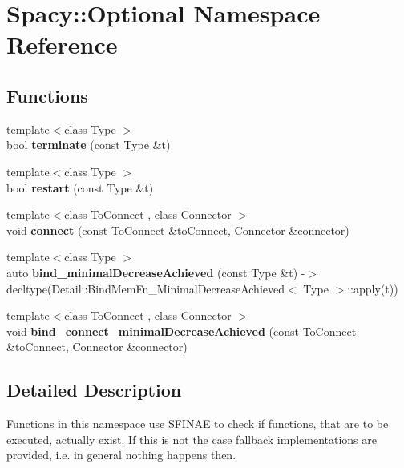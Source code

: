 \hypertarget{namespaceSpacy_1_1Optional}{\section{Spacy\-:\-:Optional Namespace Reference}
\label{namespaceSpacy_1_1Optional}
}
\subsection*{Functions}
\begin{DoxyCompactItemize}
\item 
\hypertarget{namespaceSpacy_1_1Optional_afc94d50f5d9d1b2b53b374d58fc0089f}{{\footnotesize template$<$class Type $>$ }\\bool {\bfseries terminate} (const Type \&t)}\label{namespaceSpacy_1_1Optional_afc94d50f5d9d1b2b53b374d58fc0089f}

\item 
\hypertarget{namespaceSpacy_1_1Optional_af964261e6d0480bfad637d1f707b3777}{{\footnotesize template$<$class Type $>$ }\\bool {\bfseries restart} (const Type \&t)}\label{namespaceSpacy_1_1Optional_af964261e6d0480bfad637d1f707b3777}

\item 
\hypertarget{namespaceSpacy_1_1Optional_a5569f8a0db2de323799450dd8fd0b4f2}{{\footnotesize template$<$class To\-Connect , class Connector $>$ }\\void {\bfseries connect} (const To\-Connect \&to\-Connect, Connector \&connector)}\label{namespaceSpacy_1_1Optional_a5569f8a0db2de323799450dd8fd0b4f2}

\item 
\hypertarget{namespaceSpacy_1_1Optional_aaf8f2367a615f3b96004b743695719e4}{{\footnotesize template$<$class Type $>$ }\\auto {\bfseries bind\-\_\-minimal\-Decrease\-Achieved} (const Type \&t) -\/$>$ decltype(Detail\-::\-Bind\-Mem\-Fn\-\_\-\-Minimal\-Decrease\-Achieved$<$ Type $>$\-::apply(t))}\label{namespaceSpacy_1_1Optional_aaf8f2367a615f3b96004b743695719e4}

\item 
\hypertarget{namespaceSpacy_1_1Optional_aec6afd5b7d50849fcbc842976b82c267}{{\footnotesize template$<$class To\-Connect , class Connector $>$ }\\void {\bfseries bind\-\_\-connect\-\_\-minimal\-Decrease\-Achieved} (const To\-Connect \&to\-Connect, Connector \&connector)}\label{namespaceSpacy_1_1Optional_aec6afd5b7d50849fcbc842976b82c267}

\end{DoxyCompactItemize}


\subsection{Detailed Description}
Functions in this namespace use S\-F\-I\-N\-A\-E to check if functions, that are to be executed, actually exist. If this is not the case fallback implementations are provided, i.\-e. in general nothing happens then. 